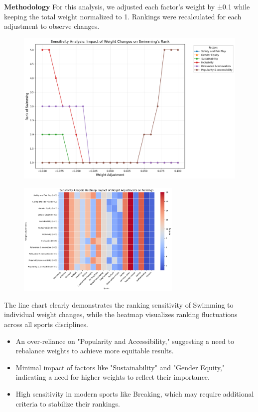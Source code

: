 \documentclass[12pt]{article}
\begin{document}
\textbf{Methodology}
For this analysis, we adjusted each factor’s weight by ±0.1 while keeping the total weight normalized to 1. Rankings were recalculated for each adjustment to observe changes. 

\begin{figure}[H]
    \centering
    \includegraphics[width=1\textwidth]{Line graph.png}
    \caption{\label{fig:Line graph}}
\end{figure}

\begin{figure}[H]
    \centering
    \includegraphics[width=0.7\textwidth]{heatmap.png}
    \caption{\label{fig:Word heatmap}}
\end{figure}

The line chart clearly demonstrates the ranking sensitivity of Swimming to individual weight changes, while the heatmap visualizes ranking fluctuations across all sports disciplines.

\begin{itemize}
    \item An over-reliance on "Popularity and Accessibility," suggesting a need to rebalance weights to achieve more equitable results.

    \item Minimal impact of factors like "Sustainability" and "Gender Equity," indicating a need for higher weights to reflect their importance.

    \item High sensitivity in modern sports like Breaking, which may require additional criteria to stabilize their rankings.
\end{itemize}
\end{document}
